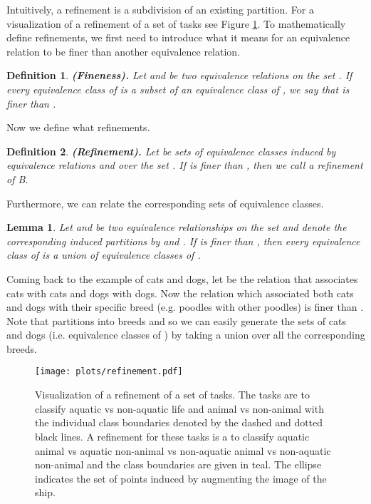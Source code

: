 \documentclass{article}
\newtheorem{lemma}{Lemma}
\newtheorem{definition}{Definition}
\begin{document}
Intuitively, a refinement is a subdivision of an existing partition. 
For a visualization of a refinement of a set of tasks see Figure \ref{fig:refinement}.
To mathematically define refinements, we first need to introduce what it means for an equivalence relation to be finer than another equivalence relation.
\begin{definition}{\bf (Fineness).}
Let  and  be two equivalence relations on the set . If every equivalence class of  is a subset of an equivalence class of , we say that  is \textit{finer} than .
\end{definition}

Now we define what refinements.
\begin{definition}{\bf (Refinement).}
    Let  be sets of equivalence classes induced by equivalence relations  and  over the set .
    If  is finer than , then we call  a \textit{refinement} of B. 
\end{definition}


Furthermore, we can relate the corresponding sets of equivalence classes.
\begin{lemma}
    Let  and  be two equivalence relationships on the set  and denote the corresponding induced partitions by  and . If  is finer than , then every equivalence class of  is a union of equivalence classes of .
\end{lemma}
Coming back to the example of cats and dogs, let  be the relation that associates cats with cats and dogs with dogs. Now the relation  which associated both cats and dogs with their specific breed (e.g. poodles with other poodles) is finer than . Note that  partitions  into breeds and so we can easily generate the sets of cats and dogs (i.e. equivalence classes of ) by taking a union over all the corresponding breeds.

\begin{figure}
    \begin{center}
    \texttt{[image: plots/refinement.pdf]}
    \end{center}
    \caption{Visualization of a refinement of a set of tasks. The tasks are to classify aquatic vs non-aquatic life and animal vs non-animal with the individual class boundaries denoted by the dashed and dotted black lines. A refinement for these tasks is a to classify aquatic animal vs aquatic non-animal vs non-aquatic animal vs non-aquatic non-animal and the class boundaries are given in teal. The ellipse indicates the set of points induced by augmenting the image of the ship.}
    \label{fig:refinement}
\end{figure}
\end{document}

